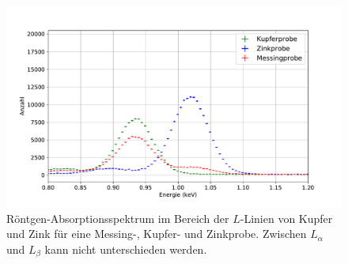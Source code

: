 \begin{figure}[H]
	\centering
	\includegraphics[width=.8\textwidth]{plots/KupferprobeL}
	\caption{Röntgen-Absorptionsspektrum im Bereich der $L$-Linien von Kupfer und Zink für eine Messing-, Kupfer- und Zinkprobe. Zwischen $L_\alpha$ und $L_\beta$ kann nicht unterschieden werden.}
	\label{fig:l-linien}
\end{figure}
